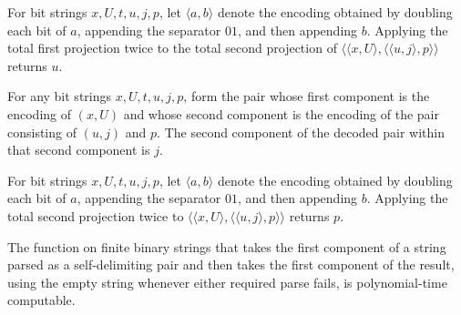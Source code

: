 \begin{theorem}
\label{Complexity.KarpLipton.gu_pair}
\leanok
{}
For bit strings $x,U,t,u,j,p$, let $\langle a,b\rangle$ denote the encoding obtained by
doubling each bit of $a$, appending the separator $01$, and then appending $b$. Applying
the total first projection twice to the total second projection of $\langle\langle
x,U\rangle,\langle\langle u,j\rangle,p\rangle\rangle$ returns $u$.
\end{theorem}

\begin{theorem}
\label{Complexity.KarpLipton.gj_pair}
\leanok
{}
For any bit strings $x,U,t,u,j,p$, form the pair whose first component is the encoding
of $(x,U)$ and whose second component is the encoding of the pair consisting of $(u,j)$
and $p$. The second component of the decoded pair within that second component is $j$.
\end{theorem}

\begin{theorem}
\label{Complexity.KarpLipton.gp_pair}
\leanok
{}
For bit strings $x,U,t,u,j,p$, let $\langle a,b\rangle$ denote the encoding obtained by
doubling each bit of $a$, appending the separator $01$, and then appending $b$. Applying
the total second projection twice to $\langle\langle x,U\rangle,\langle\langle
u,j\rangle,p\rangle\rangle$ returns $p$.
\end{theorem}

\begin{theorem}
\label{Complexity.KarpLipton.polyTimeComputable_gx}
\leanok
{}
The function on finite binary strings that takes the first component of a string parsed
as a self-delimiting pair and then takes the first component of the result, using the
empty string whenever either required parse fails, is polynomial-time computable.
\end{theorem}

